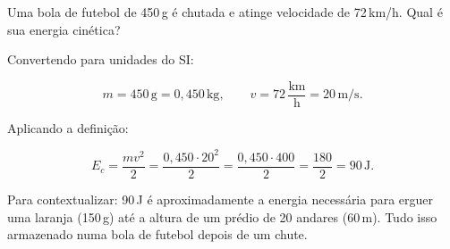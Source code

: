 \begin{exemplo}[Nível I]\label{exemplo_energia_ecineticaex01}

Uma bola de futebol de 450\,g é chutada e atinge velocidade de 72\,km/h.
Qual é sua energia cinética?
 

\resolucao

Convertendo para unidades do SI:
 
\[
    m = 450\,\text{g} = 0{,}450\,\text{kg},
    \qquad
    v = 72\,\frac{\text{km}}{\text{h}} = 20\,\text{m/s}.
\]
 
Aplicando a definição:
 
\[
    E_c = \frac{mv^2}{2}
        = \frac{0{,}450 \cdot 20^2}{2}
        = \frac{0{,}450 \cdot 400}{2}
        = \frac{180}{2}
        = 90\,\text{J}.
\]
 
 
\medskip
Para contextualizar: 90\,J é aproximadamente a energia necessária para erguer uma
laranja (150\,g) até a altura de um prédio de 20 andares (60\,m). Tudo isso armazenado
numa bola de futebol depois de um chute.

\end{exemplo}


\vspace{0.3cm}





